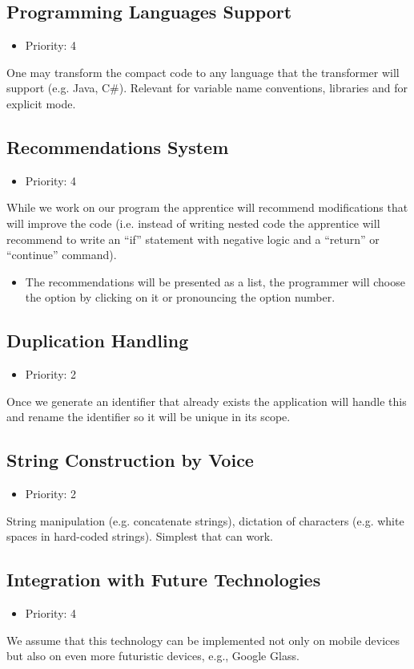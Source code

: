 \subsection{Programming Languages Support}
\begin{itemize}
	\item Priority: 4
\end{itemize}
One may transform the compact code to any language that the transformer will support (e.g. Java, C\#). Relevant for variable name conventions, libraries and for explicit mode.
\subsection{Recommendations System}
\begin{itemize}
	\item Priority: 4
\end{itemize}
While we work on our program the apprentice will recommend modifications that will improve the code (i.e. instead of writing nested code the apprentice will recommend to write an “if” statement with negative logic and a “return” or “continue” command).
\begin{itemize}
	\item The recommendations will be presented as a list, the programmer will choose the option by clicking on it or pronouncing the option number.
\end{itemize}
\subsection{Duplication Handling}
\begin{itemize}
	\item Priority: 2
\end{itemize}
Once we generate an identifier that already exists the application will handle this and rename the identifier so it will be unique in its scope.
\subsection{String Construction by Voice}
\begin{itemize}
	\item Priority: 2
\end{itemize}
String manipulation (e.g. concatenate strings), dictation of characters (e.g. white spaces in hard-coded strings). Simplest that can work.
\subsection{Integration with Future Technologies}
\begin{itemize}
	\item Priority: 4
\end{itemize}
We assume that this technology can be implemented not only on mobile devices but also on even more futuristic devices, e.g., Google Glass.
